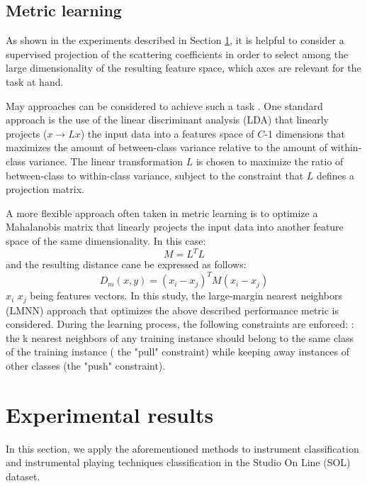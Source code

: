 \documentclass{article}
\begin{document}
\subsection{Metric learning} %

As shown in the experiments described in Section \ref{sec:exp}, it is helpful to consider a supervised projection of the scattering coefficients in order to select among the large dimensionality of the resulting feature space, which axes are relevant for the task at hand.

May approaches can be considered to achieve such a task \cite{}. One standard approach is the use of the linear discriminant analysis (LDA) that linearly projects ($x \rightarrow L x$) the input data into a features space of $C$-1 dimensions that maximizes the amount of between-class variance
relative to the amount of within-class variance. The linear transformation $L$ is chosen to maximize the ratio of between-class to within-class variance,
subject to the constraint that $L$ defines a projection matrix.


A more flexible approach often taken in metric learning \cite{bellet2013survey} is to optimize a Mahalanobis matrix that linearly projects the input data into another feature space of the same dimensionality. In this case:
\begin{equation}
  M=L^T L
\end{equation}
and the resulting distance cane be expressed as follows:
\begin{equation}
  D_m(x, y) = (x_i-x_j)^T M(x_i-x_j)
\end{equation}
$x_i$ $x_j$ being features vectors. In this study, the large-margin nearest neighbors (LMNN) approach \cite{weinberger2006nips, weinberger2009jmlr} that optimizes the above described performance metric is considered. During the learning process, the following constraints are enforced: : the
k nearest neighbors of any training instance should belong to the
same class of the training instance ( the "pull" constraint) while keeping away instances of other classes (the "push" constraint).



\section{Experimental results} \label{sec:exp}
In this section, we apply the aforementioned methods to instrument classification and instrumental playing techniques classification in the Studio On Line (SOL) dataset.
\end{document}
